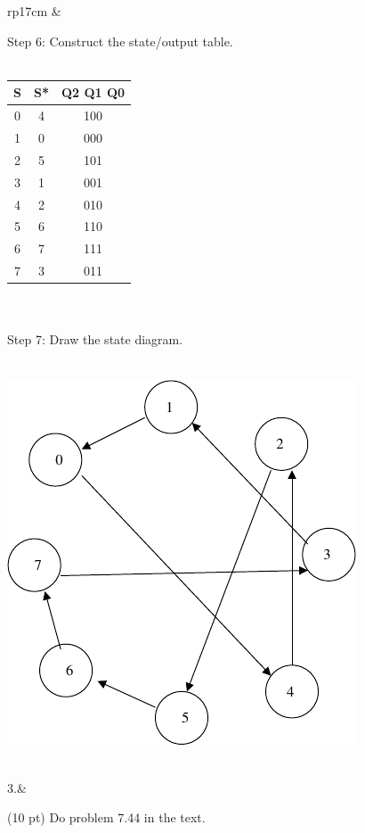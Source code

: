 \documentclass{article}
\begin{document}
\begin{longtable}[l]{rp{17cm}}
\newpage
&\begin{minipage}[t]{\linewidth}
Step 6: Construct the state/output table. \\ \\
\begin{tabular}{c|cc}
  \textbf{S} & \textbf{S*} & \textbf{Q2 Q1 Q0} \\ 
  \hline
  0 & 4 & 100 \\
  1 & 0 & 000 \\
  2 & 5 & 101 \\
  3 & 1 & 001 \\
  4 & 2 & 010 \\
  5 & 6 & 110 \\
  6 & 7 & 111 \\
  7 & 3 & 011 \\
\end{tabular} \\ \\
Step 7: Draw the state diagram. \\ \\
\begin{center}
  \includegraphics{../StateMachines/Assessments/Wakerly_7_18_StateDiagram}
\end{center}
\end{minipage}\\
\medskip
3.&\begin{minipage}[t]{\linewidth}(10 pt) Do problem 7.44 in the text. \\ \\


\end{minipage}
\end{longtable}
\end{document}
